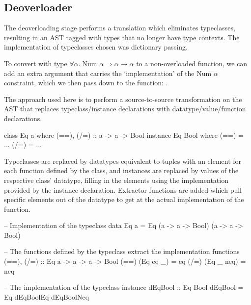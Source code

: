 \documentclass[dissertation.tex]{subfiles}
\begin{document}
{{    }
    \subsection{Deoverloader}\label{sec:deoverloading}
    {

        The deoverloading stage performs a translation which eliminates typeclasses, resulting in an AST tagged with
        types that no longer have type contexts. The implementation of typeclasses chosen was dictionary passing.

        To convert  with type \(\forall \alpha.\; \text{Num }\alpha \Rightarrow
        \alpha\rightarrow\alpha\) to a non-overloaded function, we can add an extra argument that carries the
        `implementation' of the \(\text{Num }\alpha\) constraint, which we then pass down to the \haskell{(+)}
        function: .


        The approach used here is to perform a source-to-source transformation on the AST that replaces
        typeclass/instance declarations with datatype/value/function declarations.

        \begin{haskellfigure}
        class Eq a where
            (==), (/=) :: a -> a -> Bool
        instance Eq Bool where
            (==) = ...
            (/=) = ...
        \end{haskellfigure}

        Typeclasses are replaced by datatypes equivalent to tuples with an element for each function defined by the
        class, and instances are replaced by values of the respective class' datatype, filling in the elements using the
        implementation provided by the instance declaration. Extractor functions are added which pull specific elements
        out of the datatype to get at the actual implementation of the function.

        \begin{haskellfigure}
        -- Implementation of the typeclass
        data Eq a = Eq (a -> a -> Bool) (a -> a -> Bool)

        -- The functions defined by the typeclass extract the implementation functions
        (==), (/=) :: Eq a -> a -> a -> Bool
        (==) (Eq eq _) = eq
        (/=) (Eq _ neq) = neq

        -- The implementation of the typeclass instance
        dEqBool :: Eq Bool
        dEqBool = Eq dEqBoolEq dEqBoolNeq


\end{haskellfigure}}}
\end{document}
